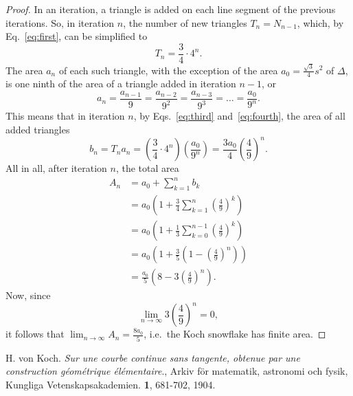 \documentclass[12pt, a4paper]{article}
\newcommand{\ubersum}[2] {
	\sum_{k=#2}^{n#1}
}
\begin{document}
\begin{proof}
In an iteration, a triangle is added on each line segment of the
previous iterations. So, in iteration $n$, the number of new triangles
$T_n = N_{n-1}$, which, by Eq.~\ref{eq:first}, can be simplified to
\begin{equation}\label{eq:third}
	T_n = \frac 3 4 \cdot 4^n.
\end{equation}
The area $a_n$ of each such triangle, with the exception of the area
$a_0 = \frac {\sqrt 3} 4 s^2$ of $\Delta$, is one ninth of the area of a
triangle added in iteration $n - 1$, or
%
\begin{equation}\label{eq:fourth}
	a_n = \frac {a_{n-1}} {9}
		= \frac {a_{n-2}} {9^2}
		= \frac {a_{n-3}} {9^3}
		= \ldots
		= \frac {a_0} {9^n}.
\end{equation}
This means that in iteration $n$, by Eqs.~\ref{eq:third} and~\ref{eq:fourth}, the area of all added
triangles
$$b_n = T_na_n = \left (
		\frac 3 4 \cdot 4^n
	\right )
	\left (
		\frac {a_0} {9^n}
	\right ) = \frac {3a_0} 4 \left (
	\frac 4 9
	\right )^n.$$
All in all, after iteration $n$, the total area
\begin{align*}
	A_n &= a_0 + \ubersum{}{1} b_k \\
		&= a_0 \left (
				1 + \frac 3 4 \ubersum{}{1}\left(\frac 4 9 \right )^k
			\right ) \\
		&= a_0 \left (
				1 + \frac 1 3 \ubersum{-1}{0}\left(\frac 4 9 \right )^k
			\right ) \\
		&= a_0 \left (
				1 + \frac 3 5 \left ( 1 - \left( \frac 4 9 \right )^n \right )
			\right ) \\
		&= \frac {a_0} 5 \left (
				8 - 3 \left ( \frac 4 9 \right )^n
			\right ).
\end{align*}
Now, since
$$
	\lim_{n \to \infty} 3 \left ( \frac 4 9 \right )^n = 0,
$$
it follows that $\lim_{n \to \infty} A_n = \frac {8a_0} 5$, i.e.\ the Koch
snowflake has finite area.
\end{proof}
\begin{thebibliography}{99}
		H. von Koch.
		\emph{Sur une courbe continue sans tangente, obtenue par une
		construction géométrique élémentaire}.,
		Arkiv för matematik, astronomi och fysik, Kungliga Vetenskapsakademien.
		{\bf 1},
		681-702,
		1904.
\end{thebibliography}

%
\end{document}
